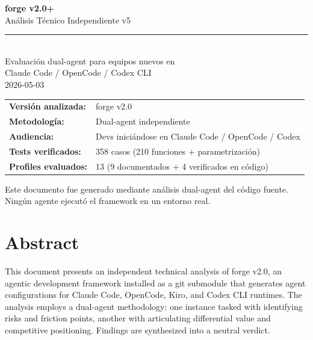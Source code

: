 \documentclass[11pt,a4paper]{article}
\begin{document}
\begin{titlepage}
\centering
\vspace*{3cm}

{\LARGE\bfseries\color{forgeblue} forge v2.0+}\\[0.5em]
{\Large Análisis Técnico Independiente v5}\\[1.5em]

\rule{0.6\textwidth}{0.4pt}\\[1em]

{\large Evaluación dual-agent para equipos nuevos en\\
Claude Code / OpenCode / Codex CLI}\\[2em]

{\normalsize 2026-05-03}\\[3em]

\begin{tabular}{ll}
\textbf{Versión analizada:} & forge v2.0 \\
\textbf{Metodología:} & Dual-agent independiente \\
\textbf{Audiencia:} & Devs iniciándose en Claude Code / OpenCode / Codex \\
\textbf{Tests verificados:} & 358 casos (210 funciones + parametrización) \\
\textbf{Profiles evaluados:} & 13 (9 documentados + 4 verificados en código) \\
\end{tabular}

\vfill
{\small\color{forgegray} Este documento fue generado mediante análisis dual-agent del código fuente.\\
Ningún agente ejecutó el framework en un entorno real.}
\end{titlepage}

\section*{Abstract}

This document presents an independent technical analysis of forge v2.0, an agentic development framework installed as a git submodule that generates agent configurations for Claude Code, OpenCode, Kiro, and Codex CLI runtimes. The analysis employs a dual-agent methodology: one instance tasked with identifying risks and friction points, another with articulating differential value and competitive positioning. Findings are synthesized into a neutral verdict.
\end{document}
